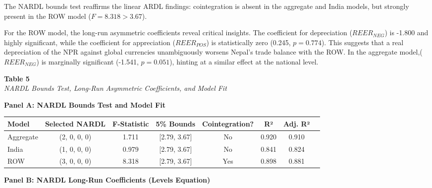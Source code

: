 \documentclass[12pt]{article}
\begin{document}
The NARDL bounds test reaffirms the linear ARDL findings: cointegration is absent in the aggregate and India models, but strongly present in the ROW model ($F = 8.318 > 3.67$).

For the ROW model, the long-run asymmetric coefficients reveal critical insights. The coefficient for depreciation ($REER_{NEG}$) is -1.800 and highly significant, while the coefficient for appreciation ($REER_{POS}$) is statistically zero (0.245, $p=0.774$). This suggests that a real depreciation of the NPR against global currencies unambiguously worsens Nepal's trade balance with the ROW. In the aggregate model,($REER_{NEG}$) is marginally significant (-1.541, $p=0.051$), hinting at a similar effect at the national level.
 
\begin{table}[htbp]
\raggedright

\textbf{Table 5}\\
\textit{NARDL Bounds Test, Long-Run Asymmetric Coefficients, and Model Fit}

\vspace{0.3cm}

\renewcommand{\arraystretch}{1.4}
\setlength{\tabcolsep}{8pt}

\textbf{Panel A: NARDL Bounds Test and Model Fit}

\begin{tabular}{lccccccc}
\hline
Model & Selected NARDL & F-Statistic & 5\% Bounds & Cointegration? & R² & Adj. R² \\
\hline
Aggregate & (2, 0, 0, 0) & 1.711 & [2.79, 3.67] & No  & 0.920 & 0.910 \\
India     & (1, 0, 0, 0) & 0.979 & [2.79, 3.67] & No  & 0.841 & 0.824 \\
ROW       & (3, 0, 0, 0) & 8.318 & [2.79, 3.67] & Yes & 0.898 & 0.881 \\
\hline
\end{tabular}

\vspace{0.5cm}

\textbf{Panel B: NARDL Long-Run Coefficients (Levels Equation)}

\vspace{0.2cm}


\end{table}
\end{document}
